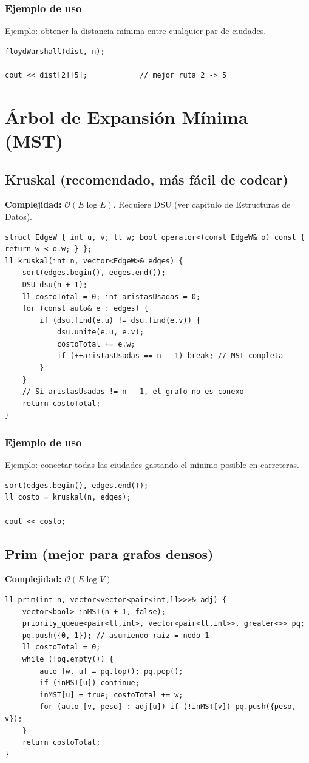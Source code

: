 \documentclass[10pt,twocolumn,letterpaper]{report}
\begin{document}
\subsubsection*{Ejemplo de uso}
Ejemplo: obtener la distancia mínima entre cualquier par de ciudades.
\begin{lstlisting}
floydWarshall(dist, n);

cout << dist[2][5];            // mejor ruta 2 -> 5
\end{lstlisting}


\section{Árbol de Expansión Mínima (MST)}

\subsection{Kruskal (recomendado, más fácil de codear)}
\textbf{Complejidad:} $\mathcal{O}(E \log E)$. Requiere DSU (ver capítulo de Estructuras de Datos).
\begin{lstlisting}
struct EdgeW { int u, v; ll w; bool operator<(const EdgeW& o) const { return w < o.w; } };
ll kruskal(int n, vector<EdgeW>& edges) {
    sort(edges.begin(), edges.end());
    DSU dsu(n + 1);
    ll costoTotal = 0; int aristasUsadas = 0;
    for (const auto& e : edges) {
        if (dsu.find(e.u) != dsu.find(e.v)) {
            dsu.unite(e.u, e.v);
            costoTotal += e.w;
            if (++aristasUsadas == n - 1) break; // MST completa
        }
    }
    // Si aristasUsadas != n - 1, el grafo no es conexo
    return costoTotal;
}
\end{lstlisting}
\subsubsection*{Ejemplo de uso}
Ejemplo: conectar todas las ciudades gastando el mínimo posible en carreteras.
\begin{lstlisting}
sort(edges.begin(), edges.end());
ll costo = kruskal(n, edges);

cout << costo;
\end{lstlisting}


\subsection{Prim (mejor para grafos densos)}
\textbf{Complejidad:} $\mathcal{O}(E \log V)$
\begin{lstlisting}
ll prim(int n, vector<vector<pair<int,ll>>>& adj) {
    vector<bool> inMST(n + 1, false);
    priority_queue<pair<ll,int>, vector<pair<ll,int>>, greater<>> pq;
    pq.push({0, 1}); // asumiendo raiz = nodo 1
    ll costoTotal = 0;
    while (!pq.empty()) {
        auto [w, u] = pq.top(); pq.pop();
        if (inMST[u]) continue;
        inMST[u] = true; costoTotal += w;
        for (auto [v, peso] : adj[u]) if (!inMST[v]) pq.push({peso, v});
    }
    return costoTotal;
}
\end{lstlisting}
\end{document}
